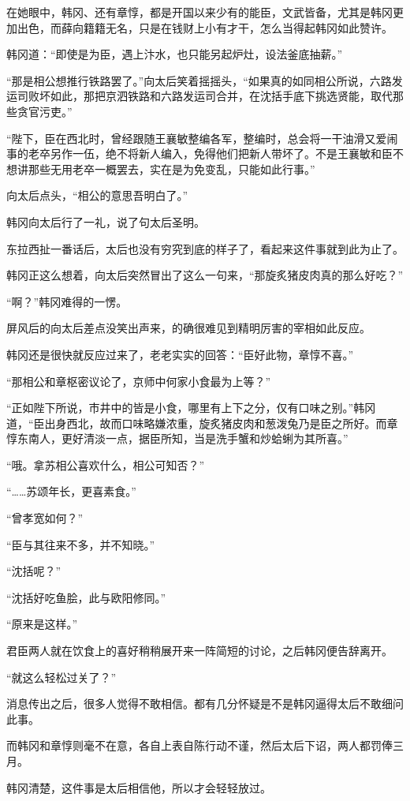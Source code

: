 在她眼中，韩冈、还有章惇，都是开国以来少有的能臣，文武皆备，尤其是韩冈更加出色，而薛向籍籍无名，只是在钱财上小有才干，怎么当得起韩冈如此赞许。

韩冈道：“即使是为臣，遇上汴水，也只能另起炉灶，设法釜底抽薪。”

“那是相公想推行铁路罢了。”向太后笑着摇摇头，“如果真的如同相公所说，六路发运司败坏如此，那把京泗铁路和六路发运司合并，在沈括手底下挑选贤能，取代那些贪官污吏。”

“陛下，臣在西北时，曾经跟随王襄敏整编各军，整编时，总会将一干油滑又爱闹事的老卒另作一伍，绝不将新人编入，免得他们把新人带坏了。不是王襄敏和臣不想讲那些无用老卒一概罢去，实在是为免变乱，只能如此行事。”

向太后点头，“相公的意思吾明白了。”

韩冈向太后行了一礼，说了句太后圣明。

东拉西扯一番话后，太后也没有穷究到底的样子了，看起来这件事就到此为止了。

韩冈正这么想着，向太后突然冒出了这么一句来，“那旋炙猪皮肉真的那么好吃？”

“啊？”韩冈难得的一愣。

屏风后的向太后差点没笑出声来，的确很难见到精明厉害的宰相如此反应。

韩冈还是很快就反应过来了，老老实实的回答：“臣好此物，章惇不喜。”

“那相公和章枢密议论了，京师中何家小食最为上等？”

“正如陛下所说，市井中的皆是小食，哪里有上下之分，仅有口味之别。”韩冈道，“臣出身西北，故而口味略嫌浓重，旋炙猪皮肉和葱泼兔乃是臣之所好。而章惇东南人，更好清淡一点，据臣所知，当是洗手蟹和炒蛤蜊为其所喜。”

“哦。拿苏相公喜欢什么，相公可知否？”

“……苏颂年长，更喜素食。”

“曾孝宽如何？”

“臣与其往来不多，并不知晓。”

“沈括呢？”

“沈括好吃鱼脍，此与欧阳修同。”

“原来是这样。”

君臣两人就在饮食上的喜好稍稍展开来一阵简短的讨论，之后韩冈便告辞离开。

“就这么轻松过关了？”

消息传出之后，很多人觉得不敢相信。都有几分怀疑是不是韩冈逼得太后不敢细问此事。

而韩冈和章惇则毫不在意，各自上表自陈行动不谨，然后太后下诏，两人都罚俸三月。

韩冈清楚，这件事是太后相信他，所以才会轻轻放过。

